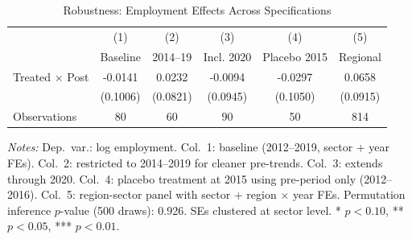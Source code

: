 \begin{table}[htbp]
\centering
\caption{Robustness: Employment Effects Across Specifications}
\label{tab:robustness}
\begin{tabular}{lccccc}
\toprule
 & (1) & (2) & (3) & (4) & (5) \\
 & Baseline & 2014--19 & Incl. 2020 & Placebo 2015 & Regional \\
\midrule
Treated $\times$ Post & -0.0141 & 0.0232 & -0.0094 & -0.0297 & 0.0658 \\
 & (0.1006) & (0.0821) & (0.0945) & (0.1050) & (0.0915) \\
\midrule
Observations & 80 & 60 & 90 & 50 & 814 \\
\bottomrule
\end{tabular}
\begin{minipage}{\textwidth}
\vspace{0.5em}
\footnotesize
\textit{Notes:} Dep.~var.: log employment. Col.~1: baseline (2012--2019, sector + year FEs). Col.~2: restricted to 2014--2019 for cleaner pre-trends. Col.~3: extends through 2020. Col.~4: placebo treatment at 2015 using pre-period only (2012--2016). Col.~5: region-sector panel with sector + region $\times$ year FEs. Permutation inference $p$-value (500 draws): 0.926. SEs clustered at sector level. * $p<0.10$, ** $p<0.05$, *** $p<0.01$.
\end{minipage}
\end{table}

